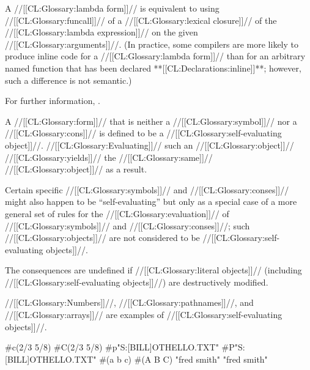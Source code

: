 A //[[CL:Glossary:lambda form]]// is equivalent to using //[[CL:Glossary:funcall]]// of a
//[[CL:Glossary:lexical closure]]// of the //[[CL:Glossary:lambda expression]]// on the given //[[CL:Glossary:arguments]]//.
(In practice, some compilers are more likely to produce inline code 
for a //[[CL:Glossary:lambda form]]// than for an arbitrary named function 
that has been declared **[[CL:Declarations:inline]]**; however, such a difference
is not semantic.)

For further information, \seesection\LambdaExpressions.

\endsubsubsubsubsection%

\endsubsubsubsection%


A //[[CL:Glossary:form]]// that is neither a //[[CL:Glossary:symbol]]// nor a //[[CL:Glossary:cons]]// is 
defined to be a //[[CL:Glossary:self-evaluating object]]//.  //[[CL:Glossary:Evaluating]]//
such an //[[CL:Glossary:object]]// //[[CL:Glossary:yields]]// the //[[CL:Glossary:same]]// //[[CL:Glossary:object]]// 
as a result.


Certain specific //[[CL:Glossary:symbols]]// and //[[CL:Glossary:conses]]// might also happen 
to be ``self-evaluating'' but only as a special case of a more 
general set of rules for the //[[CL:Glossary:evaluation]]// of //[[CL:Glossary:symbols]]// and
//[[CL:Glossary:conses]]//; such //[[CL:Glossary:objects]]// are not considered to be
//[[CL:Glossary:self-evaluating objects]]//.


The consequences are undefined if //[[CL:Glossary:literal objects]]// (including
//[[CL:Glossary:self-evaluating objects]]//) are destructively modified.


//[[CL:Glossary:Numbers]]//, //[[CL:Glossary:pathnames]]//, and //[[CL:Glossary:arrays]]// are examples of
//[[CL:Glossary:self-evaluating objects]]//.

 
 #c(2/3 5/8) \EV #C(2/3 5/8)
 #p"S:[BILL]OTHELLO.TXT" \EV #P"S:[BILL]OTHELLO.TXT"
 #(a b c) \EV #(A B C)
 "fred smith" \EV "fred smith"
\endcode

\endsubsubsubsubsection%

\endsubsubsubsection%

\endsubsubsection%

